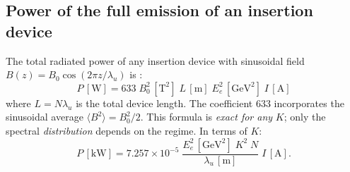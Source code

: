 \documentclass[11pt,a4paper]{article}
\begin{document}
\subsection{Power of the full emission of an insertion device}
The total radiated power of any insertion device with sinusoidal field
$B(z) = B_0\cos(2\pi z/\lambda_u)$ is \cite{kim1989}:
\begin{equation}
  \boxed{P\,[\text{W}] = 633\; B_0^2\,[\text{T}^2]\; L\,[\text{m}]\;
         E_e^2\,[\text{GeV}^2]\; I\,[\text{A}]}
  \label{eq:ptotal}
\end{equation}
where $L = N\lambda_u$ is the total device length.  The coefficient 633 incorporates the
sinusoidal average $\langle B^2\rangle = B_0^2/2$.  This formula is \emph{exact for any}
$K$; only the spectral \emph{distribution} depends on the regime.  In terms of $K$:
\begin{equation}
  P\,[\text{kW}] = 7.257\times10^{-5}\;
    \frac{E_e^2\,[\text{GeV}^2]\; K^2\; N}{\lambda_u\,[\text{m}]}\; I\,[\text{A}].
  \label{eq:ptotal_K}
\end{equation}

\end{document}
